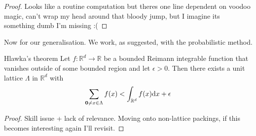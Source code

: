 \documentclass{article}
\begin{document}
\begin{proof}
    Looks like a routine computation but theres one line dependent on voodoo magic, can't wrap my head around that 
    bloody jump, but I imagine its something dumb I'm missing :(
\end{proof}

Now for our generalisation. We work, as suggested, with the probabilistic method. 

\begin{theorem}[]{Hlawka's theorem}
    Let $f: \mathbb{R}^d \to \mathbb{R}$ be a bounded Reimann integrable function that vanishes outside of some bounded
    region and let $\epsilon > 0$. Then there exists a unit lattice $\Lambda$ in $\mathbb{R}^d$ with 
    \[\sum_{{\bf 0} \neq x \in \Lambda}f(x) < \int_{\mathbb{R}^d}f(x)\mathrm{d}x + \epsilon\]
\end{theorem} 

\begin{proof}
    Skill issue + lack of relevance. Moving onto non-lattice packings, if this becomes interesting again I'll revisit.
\end{proof}

\newpage


 
\end{document}
